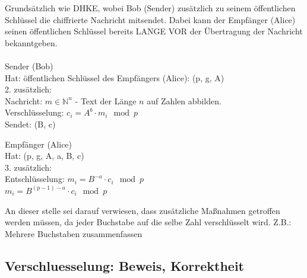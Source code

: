 \documentclass[
  a4paper,
  11pt,
]{article}
\begin{document}
Grundsätzlich wie DHKE, wobei Bob (Sender) zusätzlich zu seinem öffentlichen Schlüssel die chiffrierte Nachricht mitsendet. Dabei kann der Empfänger (Alice)
seinen öffentlichen Schlüssel bereits LANGE VOR der Übertragung der Nachricht bekanntgeben.\\\\

Sender (Bob)\\
Hat: öffentlichen Schlüssel des Empfängers (Alice): (p, g, A)\\
2.	zusätzlich:\\
	Nachricht: ${m\in \mathbb{N}^n}$ - Text der Länge $n$ auf Zahlen abbilden.\\
	Verschlüsselung:	$c_i=A^b\cdot m_i\mod p$\\
	Sendet:	(B, c)

Empfänger (Alice)\\
Hat: (p, g, A, a, B, c)\\
3.	zusätzlich:\\
	Entschlüsselung:	$m_i=B^{-a}\cdot c_i\mod p$\\
	$m_i=B^{(p-1)-a}\cdot c_i\mod p$
	
An dieser stelle sei darauf verwiesen, dass zusätzliche Maßnahmen getroffen werden müssen, da jeder Buchstabe auf die selbe Zahl verschlüsselt wird.
Z.B.: Mehrere Buchstaben zusammenfassen

\subsection*{Verschluesselung: Beweis, Korrektheit}
\label{sub:Verschluesselung: Beweis, Korrektheit}

%
%
\end{document}
